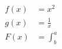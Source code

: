 \documentclass{article}
\begin{document}
	\begin{align*}
	f(x) &=x^{2}\\
	g(x) &= \frac{1}{x}\\
	F(x) &= \int^a_b
	\end{align*}
\end{document}
